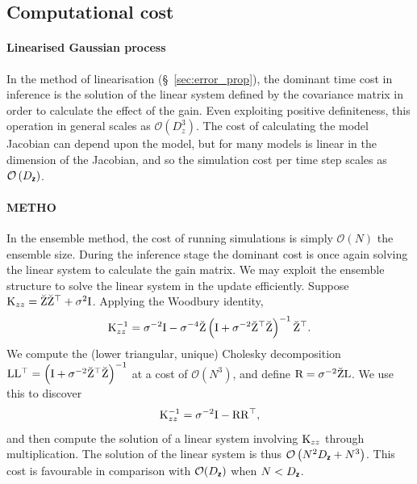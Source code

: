 \subsection{Computational cost}
\label{sec:computational_cost}
\paragraph{Linearised Gaussian process} In the method of linearisation (\S~\ref{sec:error_prop}), the dominant time cost in inference is the solution of the linear system defined by the covariance matrix in order to calculate the effect of the gain. 
Even exploiting positive definiteness, this operation in general scales as \(\mathcal{O}\left(D_{z}^3\right)\).
The cost of calculating the model Jacobian can depend upon the model, but for many models is linear in the dimension of the Jacobian, and so the simulation cost per time step scales as \(\mathcal{O}\left(D_{\boldsymbol{\mathsf{z}}}\right)\).

\paragraph{\textbf{METHO}} In the ensemble method, the cost of running simulations is simply \(\mathcal{O}\left(N\right)\) the ensemble size.
During the inference stage the dominant cost is once again solving the linear system to calculate the gain matrix.
We may exploit the ensemble structure to solve the linear system in the update efficiently.
Suppose \(\mathrm{K}_{zz}=\breve{\mathrm{Z}} \breve{\mathrm{Z}}^{\top}+\sigma^2\mathrm{I}\).
Applying the Woodbury identity,
\begin{align*}
\mathrm{K}_{zz}^{-1}=\sigma^{-2}\mathrm{I}-\sigma^{-4} \breve{\mathrm{Z}}\left(\mathrm{I}+\sigma^{-2}\breve{\mathrm{Z}}^{\top}  \breve{\mathrm{Z}}\right)^{-1} \breve{\mathrm{Z}}^{\top}.
\end{align*}
We compute the (lower triangular, unique) Cholesky decomposition \(\mathrm{L} \mathrm{L}^{\top}=\left(\mathrm{I}+\sigma^{-2}\breve{\mathrm{Z}}^{\top} \breve{\mathrm{Z}}\right)^{-1}\) at a cost of $\mathcal{O}(N^3)$, and define \(\mathrm{R}=\sigma^{-2}\breve{\mathrm{Z}} \mathrm{L}\).
We use this to discover 
\[
\mathrm{K}_{zz}^{-1}=\sigma^{-2}\mathrm{I}-\mathrm{R} \mathrm{R}^{\top},
\]
and then compute the solution of a linear system involving $\mathrm{K}_{zz}$ through multiplication.
The solution of the linear system is thus \(\mathcal{O}\left(N^2 D_{\boldsymbol{\mathsf{z}}}+N^3\right)\).
This cost is favourable in comparison with $\mathcal{O}(D_{\boldsymbol{\mathsf{z}}})$ when $N < D_{\boldsymbol{\mathsf{z}}}$.